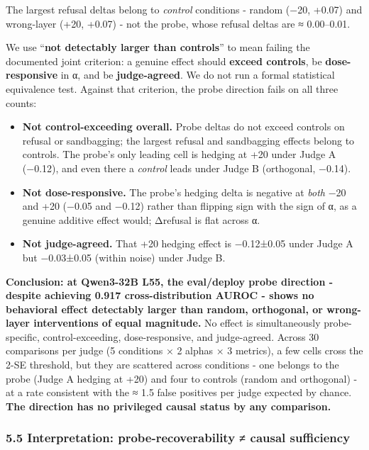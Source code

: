 \documentclass[
]{article}
\providecommand{\tightlist}{%
  \setlength{\itemsep}{0pt}\setlength{\parskip}{0pt}}
\begin{document}
The largest refusal deltas belong to \emph{control} conditions - random
(−20, +0.07) and wrong-layer (+20, +0.07) - not the probe, whose refusal
deltas are ≈ 0.00--0.01.

We use ``\textbf{not detectably larger than controls}'' to mean failing
the documented joint criterion: a genuine effect should \textbf{exceed
controls}, be \textbf{dose-responsive} in α, and be
\textbf{judge-agreed}. We do not run a formal statistical equivalence
test. Against that criterion, the probe direction fails on all three
counts:

\begin{itemize}
\tightlist
\item
  \textbf{Not control-exceeding overall.} Probe deltas do not exceed
  controls on refusal or sandbagging; the largest refusal and
  sandbagging effects belong to controls. The probe's only leading cell
  is hedging at +20 under Judge A (−0.12), and even there a
  \emph{control} leads under Judge B (orthogonal, −0.14).
\item
  \textbf{Not dose-responsive.} The probe's hedging delta is negative at
  \emph{both} −20 and +20 (−0.05 and −0.12) rather than flipping sign
  with the sign of α, as a genuine additive effect would; Δrefusal is
  flat across α.
\item
  \textbf{Not judge-agreed.} That +20 hedging effect is −0.12±0.05 under
  Judge A but −0.03±0.05 (within noise) under Judge B.
\end{itemize}

\textbf{Conclusion: at Qwen3-32B L55, the eval/deploy probe direction -
despite achieving 0.917 cross-distribution AUROC - shows no behavioral
effect detectably larger than random, orthogonal, or wrong-layer
interventions of equal magnitude.} No effect is simultaneously
probe-specific, control-exceeding, dose-responsive, and judge-agreed.
Across 30 comparisons per judge (5 conditions × 2 alphas × 3 metrics), a
few cells cross the 2-SE threshold, but they are scattered across
conditions - one belongs to the probe (Judge A hedging at +20) and four
to controls (random and orthogonal) - at a rate consistent with the ≈
1.5 false positives per judge expected by chance. \textbf{The direction
has no privileged causal status by any comparison.}

\subsubsection{5.5 Interpretation: probe-recoverability ≠ causal
sufficiency}\label{interpretation-probe-recoverability-causal-sufficiency}
\end{document}

